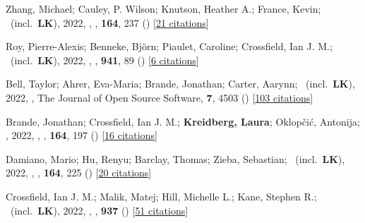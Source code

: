 \item[{\color{numcolor}\scriptsize75}] Zhang, Michael; Cauley, P. Wilson; Knutson, Heather A.; France, Kevin; \etal\ (incl.\ \textbf{LK}), 2022, , \aj, \textbf{164}, 237 () [\href{https://ui.adsabs.harvard.edu/abs/2022AJ....164..237Z}{21 citations}]

\item[{\color{numcolor}\scriptsize74}] Roy, Pierre-Alexis; Benneke, Bj{\"o}rn; Piaulet, Caroline; Crossfield, Ian J. M.; \etal\ (incl.\ \textbf{LK}), 2022, , \apj, \textbf{941}, 89 () [\href{https://ui.adsabs.harvard.edu/abs/2022ApJ...941...89R}{6 citations}]

\item[{\color{numcolor}\scriptsize73}] Bell, Taylor; Ahrer, Eva-Maria; Brande, Jonathan; Carter, Aarynn; \etal\ (incl.\ \textbf{LK}), 2022, , The Journal of Open Source Software, \textbf{7}, 4503 () [\href{https://ui.adsabs.harvard.edu/abs/2022JOSS....7.4503B}{103 citations}]

\item[{\color{numcolor}\scriptsize72}] Brande, Jonathan; Crossfield, Ian J. M.; \textbf{Kreidberg, Laura}; Oklop{\v{c}}i{\'c}, Antonija; \etal, 2022, , \aj, \textbf{164}, 197 () [\href{https://ui.adsabs.harvard.edu/abs/2022AJ....164..197B}{16 citations}]

\item[{\color{numcolor}\scriptsize71}] Damiano, Mario; Hu, Renyu; Barclay, Thomas; Zieba, Sebastian; \etal\ (incl.\ \textbf{LK}), 2022, , \aj, \textbf{164}, 225 () [\href{https://ui.adsabs.harvard.edu/abs/2022AJ....164..225D}{20 citations}]

\item[{\color{numcolor}\scriptsize70}] Crossfield, Ian J. M.; Malik, Matej; Hill, Michelle L.; Kane, Stephen R.; \etal\ (incl.\ \textbf{LK}), 2022, , \apj, \textbf{937} () [\href{https://ui.adsabs.harvard.edu/abs/2022ApJ...937L..17C}{51 citations}]

